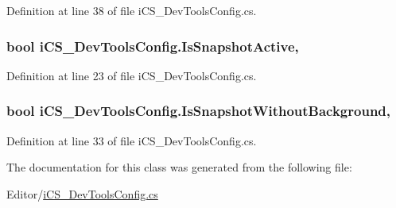 Definition at line 38 of file i\+C\+S\+\_\+\+Dev\+Tools\+Config.\+cs.

\hypertarget{classi_c_s___dev_tools_config_a4acab4c553ba73cd2000625ada3acd4a}{
\subsubsection[{Is\+Snapshot\+Active}]{\setlength{\rightskip}{0pt plus 5cm}bool i\+C\+S\+\_\+\+Dev\+Tools\+Config.\+Is\+Snapshot\+Active\hspace{0.3cm}{\ttfamily [static]}, {\ttfamily [get]}}}\label{classi_c_s___dev_tools_config_a4acab4c553ba73cd2000625ada3acd4a}


Definition at line 23 of file i\+C\+S\+\_\+\+Dev\+Tools\+Config.\+cs.

\hypertarget{classi_c_s___dev_tools_config_a6254893abcbc554f181329dd3866aec5}{
\subsubsection[{Is\+Snapshot\+Without\+Background}]{\setlength{\rightskip}{0pt plus 5cm}bool i\+C\+S\+\_\+\+Dev\+Tools\+Config.\+Is\+Snapshot\+Without\+Background\hspace{0.3cm}{\ttfamily [static]}, {\ttfamily [get]}}}\label{classi_c_s___dev_tools_config_a6254893abcbc554f181329dd3866aec5}


Definition at line 33 of file i\+C\+S\+\_\+\+Dev\+Tools\+Config.\+cs.



The documentation for this class was generated from the following file\+:\begin{DoxyCompactItemize}
\item 
Editor/\hyperlink{i_c_s___dev_tools_config_8cs}{i\+C\+S\+\_\+\+Dev\+Tools\+Config.\+cs}\end{DoxyCompactItemize}
